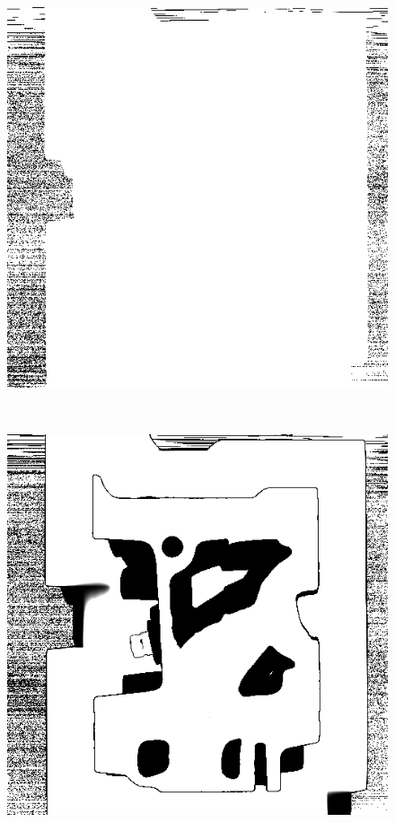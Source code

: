 \begin{figure}
	\centering
	\begin{minipage}{.33\textwidth}
		\includegraphics[width=1\linewidth]{images/engine_naive_saliencemap_1}
	\end{minipage}~
	\begin{minipage}{.33\textwidth}
		\includegraphics[width=1\linewidth]{images/engine_naive_saliencemap_2}

\end{minipage}
\end{figure}
